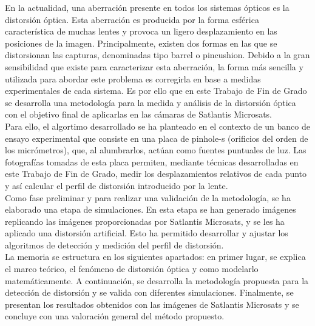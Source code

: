 \documentclass[12pt]{article}
\numberwithin{equation}{section}%
\newcommand{\lightit}[1]{{\lightitfont #1}}
\begin{document}
En la actualidad, una aberración presente en todos los sistemas ópticos es la distorsión óptica. Esta aberración es producida por la forma esférica característica de muchas lentes y provoca un ligero desplazamiento en las posiciones de la imagen. Principalmente, existen dos formas en las que se distorsionan las capturas, denominadas tipo \lightit{barrel} o \lightit{pincushion}. Debido a la gran sensibilidad que existe para caracterizar esta aberración, la forma más sencilla y utilizada para abordar este problema es corregirla en base a medidas experimentales de cada sistema. Es por ello que en este Trabajo de Fin de Grado se desarrolla una metodología para la medida y análisis de la distorsión óptica con el objetivo final de aplicarlas en las cámaras de Satlantis Microsats.\\

Para ello, el algortimo desarrollado se ha planteado en el contexto de un banco de ensayo experimental que consiste en una placa de \lightit{pinhole}-s (orificios del orden de los micrómetros), que, al alumbrarlos, actúan como fuentes puntuales de luz. Las fotografías tomadas de esta placa permiten, mediante técnicas desarrolladas en este Trabajo de Fin de Grado, medir los desplazamientos relativos de cada punto y así calcular el perfil de distorsión introducido por la lente.\\

Como fase preliminar y para realizar una validación de la metodología, se ha elaborado una etapa de simulaciones. En esta etapa se han generado imágenes replicando las imágenes proporcionadas por Satlantis Microsats, y se les ha aplicado una distorsión artificial. Esto ha permitido desarrollar y ajustar los algoritmos de detección y medición del perfil de distorsión.\\

La memoria se estructura en los siguientes apartados: en primer lugar, se explica el marco teórico, el fenómeno de distorsión óptica y como modelarlo matemáticamente. A continuación, se desarrolla la metodología propuesta para la detección de distorsión y se valida con diferentes simulaciones. Finalmente, se presentan los resultados obtenidos con las imágenes de Satlantis Microsats y se concluye con una valoración general del método propuesto.

\newpage
\end{document}
